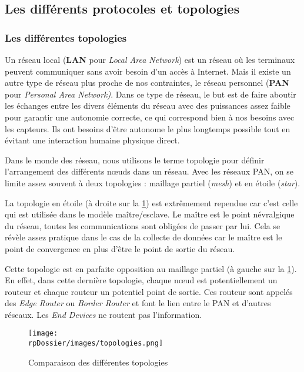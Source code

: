
\subsection{Les différents protocoles et topologies}

\subsubsection{Les différentes topologies}

Un réseau local (\textbf{LAN} pour \textit{Local Area Network}) est un réseau où les terminaux peuvent communiquer sans avoir besoin d'un accès à Internet. Mais il existe un autre type de réseau plus proche de nos contraintes, le réseau personnel (\textbf{PAN} pour \textit{Personal Area Network)}. Dans ce type de réseau, le but est de faire aboutir les échanges entre les divers éléments du réseau avec des puissances assez faible pour garantir une autonomie correcte, ce qui correspond bien à nos besoins avec les capteurs. Ils ont besoins d'être autonome le plus longtemps possible tout en évitant une interaction humaine physique direct. 

Dans le monde des réseau, nous utilisons le terme topologie pour définir l'arrangement des différents nœuds dans un réseau. Avec les réseaux PAN, on se limite assez souvent à deux topologies : maillage partiel (\textit{mesh}) et en étoile (\textit{star}).

La topologie en étoile (à droite sur la \cref{topologies}) est extrêmement rependue car c'est celle qui est utilisée dans le modèle maître/esclave. Le maître est le point névralgique du réseau, toutes les communications sont obligées de passer par lui. Cela se révèle assez pratique dans le cas de la collecte de données car le maître est le point de convergence en plus d'être le point de sortie du réseau.

Cette topologie est en parfaite opposition au maillage partiel (à gauche sur la \cref{topologies}). En effet, dans cette dernière topologie, chaque nœud est potentiellement un routeur et chaque routeur un potentiel point de sortie. Ces routeur sont appelés des \textit{Edge Router} ou \textit{Border Router} et font le lien entre le PAN et d'autres réseaux. Les \textit{End Devices} ne routent pas l'information.

\begin{figure}[h]
\centering
\texttt{[image: \\rpDossier/images/topologies.png]}
\caption{Comparaison des différentes topologies}
\label{topologies}
\end{figure}

